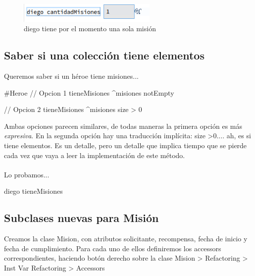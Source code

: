 \documentclass[a4paper,12pt]{book}
\begin{document}
\begin{figure}[h!]
    \centering	
    \includegraphics[width=0.6\textwidth]{images/15_diego_cantidadMisiones.png}
    \caption{diego tiene por el momento una sola misión}
\end{figure}
\FloatBarrier

\subsection{Saber si una colección tiene elementos}
Queremos saber si un héroe tiene misiones...

\begin{code}
#Heroe
// Opcion 1
tieneMisiones
    ^misiones notEmpty
\end{code}

    
\begin{code}
// Opcion 2
tieneMisiones
    ^misiones size > 0
\end{code}

Ambas opciones parecen similares, de todas maneras la primera opción es más \textit{expresiva}. En la segunda
opción hay una traducción implícita: size \textgreater  0.... ah, es si tiene elementos. Es un detalle, 
pero un detalle que implica tiempo que se pierde cada vez que vaya a leer la implementación de este método.
\\
\\
Lo probamos...

\begin{code}
diego tieneMisiones
\end{code}

\subsection{Subclases nuevas para Misión}
Creamos la clase Mision, con atributos solicitante, recompensa, fecha de inicio y fecha de cumplimiento. 
Para cada uno de ellos definiremos los accessors correspondientes, haciendo botón derecho sobre la clase
Mision > Refactoring > Inst Var Refactoring > Accessors 
\end{document}
